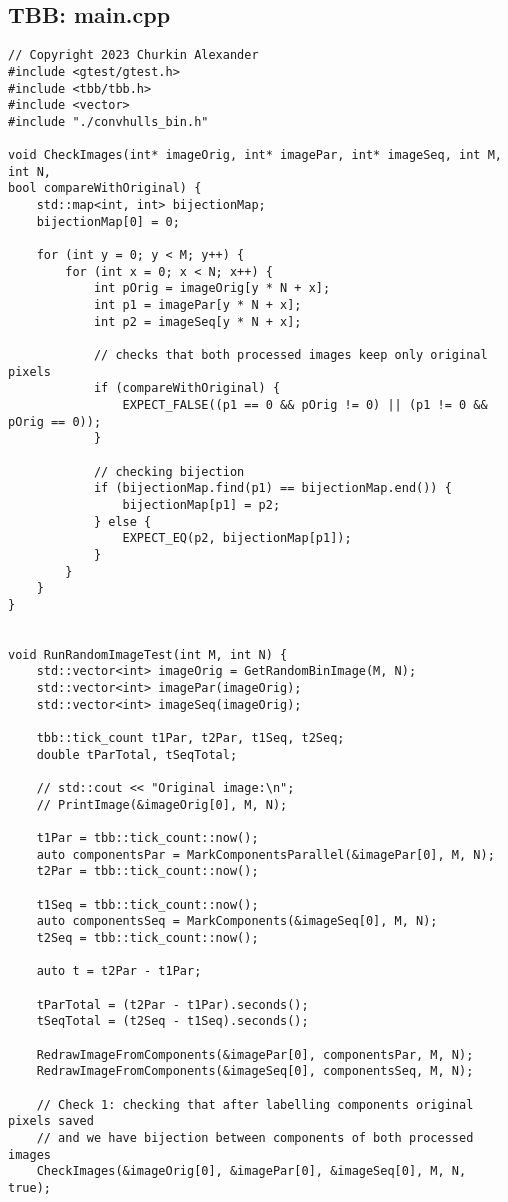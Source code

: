 \documentclass[14pt, russian]{extarticle}
\begin{document}
	\subsection{TBB: main.cpp}
	\begin{lstlisting}
// Copyright 2023 Churkin Alexander
#include <gtest/gtest.h>
#include <tbb/tbb.h>
#include <vector>
#include "./convhulls_bin.h"

void CheckImages(int* imageOrig, int* imagePar, int* imageSeq, int M, int N,
bool compareWithOriginal) {
	std::map<int, int> bijectionMap;
	bijectionMap[0] = 0;
	
	for (int y = 0; y < M; y++) {
		for (int x = 0; x < N; x++) {
			int pOrig = imageOrig[y * N + x];
			int p1 = imagePar[y * N + x];
			int p2 = imageSeq[y * N + x];
			
			// checks that both processed images keep only original pixels
			if (compareWithOriginal) {
				EXPECT_FALSE((p1 == 0 && pOrig != 0) || (p1 != 0 && pOrig == 0));
			}
			
			// checking bijection
			if (bijectionMap.find(p1) == bijectionMap.end()) {
				bijectionMap[p1] = p2;
			} else {
				EXPECT_EQ(p2, bijectionMap[p1]);
			}
		}
	}
}


void RunRandomImageTest(int M, int N) {
	std::vector<int> imageOrig = GetRandomBinImage(M, N);
	std::vector<int> imagePar(imageOrig);
	std::vector<int> imageSeq(imageOrig);
	
	tbb::tick_count t1Par, t2Par, t1Seq, t2Seq;
	double tParTotal, tSeqTotal;
	
	// std::cout << "Original image:\n";
	// PrintImage(&imageOrig[0], M, N);
	
	t1Par = tbb::tick_count::now();
	auto componentsPar = MarkComponentsParallel(&imagePar[0], M, N);
	t2Par = tbb::tick_count::now();
	
	t1Seq = tbb::tick_count::now();
	auto componentsSeq = MarkComponents(&imageSeq[0], M, N);
	t2Seq = tbb::tick_count::now();
	
	auto t = t2Par - t1Par;
	
	tParTotal = (t2Par - t1Par).seconds();
	tSeqTotal = (t2Seq - t1Seq).seconds();
	
	RedrawImageFromComponents(&imagePar[0], componentsPar, M, N);
	RedrawImageFromComponents(&imageSeq[0], componentsSeq, M, N);
	
	// Check 1: checking that after labelling components original pixels saved
	// and we have bijection between components of both processed images
	CheckImages(&imageOrig[0], &imagePar[0], &imageSeq[0], M, N, true);
	

\end{lstlisting}
\end{document}
